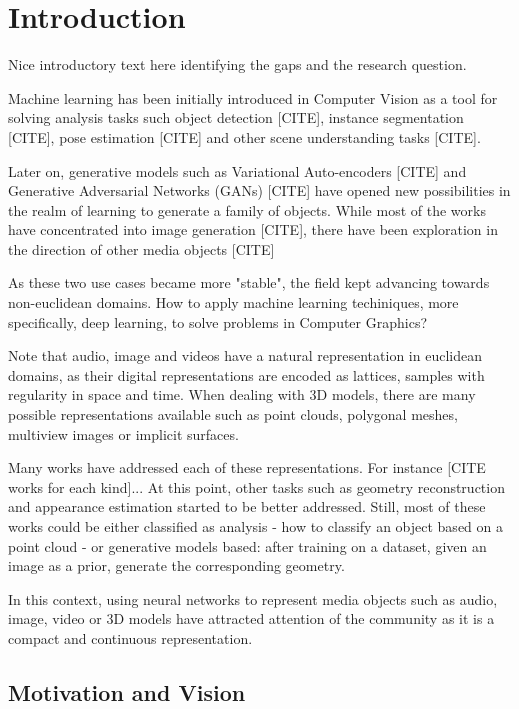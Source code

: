 \chapter{Introduction}

Nice introductory text here identifying the gaps and the research question.



Machine learning has been initially introduced in Computer Vision as a tool for solving analysis tasks such object detection [CITE], instance segmentation [CITE], pose estimation [CITE] and other scene understanding tasks [CITE]. 

Later on, generative models such as Variational Auto-encoders [CITE] and Generative Adversarial Networks (GANs) [CITE] have opened new possibilities in the realm of learning to generate a family of objects. While most of the works have concentrated into image generation [CITE], there have been exploration in the direction of other media objects [CITE]


As these two use cases became more "stable", the field kept advancing towards non-euclidean domains. How to apply machine learning techiniques, more specifically, deep learning, to solve problems in Computer Graphics?

Note that audio, image and videos have a natural representation in euclidean domains, as their digital representations are encoded as lattices, samples with regularity in space and time. When dealing with 3D models, there are many possible representations available such as point clouds, polygonal meshes, multiview images or implicit surfaces.

Many works have addressed each of these representations. For instance [CITE works for each kind]... At this point, other tasks such as geometry reconstruction and appearance estimation started to be better addressed. Still, most of these works could be either classified as analysis - how to classify an object based on a point cloud - or generative models based: after training on a dataset, given an image as a prior, generate the corresponding geometry.

In this context, using neural networks to represent media objects such as audio, image, video or 3D models have attracted attention of the community as it is a compact and continuous representation. 


\section{Motivation and Vision}

